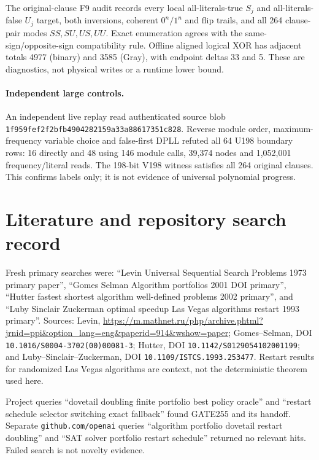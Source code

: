 \documentclass[11pt]{article}
\begin{document}
The original-clause F9 audit records every local all-literals-true $S_j$ and
all-literals-false $U_j$ target, both inversions, coherent $0^n/1^n$ and flip
trails, and all 264 clause-pair modes $SS,SU,US,UU$.  Exact enumeration agrees
with the same-sign/opposite-sign compatibility rule.  Offline aligned logical
XOR has adjacent totals 4977 (binary) and 3585 (Gray), with endpoint deltas 33
and 5.  These are diagnostics, not physical writes or a runtime lower bound.

\paragraph{Independent large controls.}
An independent live replay read authenticated source blob
\texttt{1f959fef2f2bfb4904282159a33a88617351c828}.  Reverse module order,
maximum-frequency variable choice and false-first DPLL refuted all 64 U198
boundary rows: 16 directly and 48 using 146 module calls, 39,374 nodes and
1,052,001 frequency/literal reads.  The 198-bit V198 witness satisfies all 264
original clauses.  This confirms labels only; it is not evidence of universal
polynomial progress.

\section{Literature and repository search record}
Fresh primary searches were: ``Levin Universal Sequential Search Problems
1973 primary paper'', ``Gomes Selman Algorithm portfolios 2001 DOI primary'',
``Hutter fastest shortest algorithm well-defined problems 2002 primary'', and
``Luby Sinclair Zuckerman optimal speedup Las Vegas algorithms restart 1993
primary''.  Sources: Levin, \url{https://m.mathnet.ru/php/archive.phtml?jrnid=ppi&option_lang=eng&paperid=914&wshow=paper};
Gomes--Selman, DOI \texttt{10.1016/S0004-3702(00)00081-3}; Hutter, DOI
\texttt{10.1142/S0129054102001199}; and Luby--Sinclair--Zuckerman, DOI
\texttt{10.1109/ISTCS.1993.253477}.  Restart results for randomized Las Vegas
algorithms are context, not the deterministic theorem used here.

Project queries ``dovetail doubling finite portfolio best policy oracle'' and
``restart schedule selector switching exact fallback'' found GATE255 and its
handoff.  Separate \texttt{github.com/openai} queries ``algorithm portfolio
dovetail restart doubling'' and ``SAT solver portfolio restart schedule''
returned no relevant hits.  Failed search is not novelty evidence.
\end{document}
